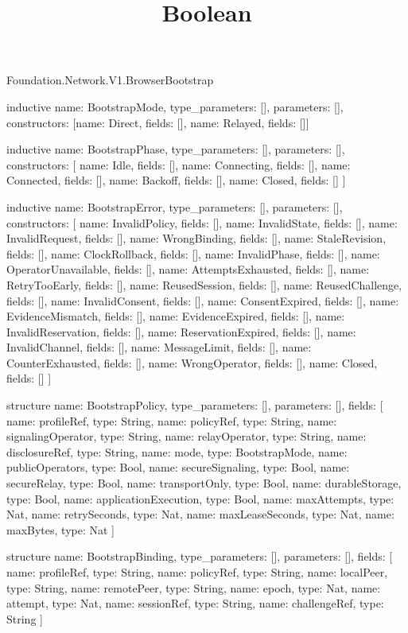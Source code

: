 \begin{lexlean}{Foundation.Network.V1.BrowserBootstrap}
\title{Boolean}
\begin{semanticmodule}
inductive{
  name: BootstrapMode,
  type_parameters: [],
  parameters: [],
  constructors: [{name: Direct, fields: []}, {name: Relayed, fields: []}]
}

inductive{
  name: BootstrapPhase,
  type_parameters: [],
  parameters: [],
  constructors: [
    {name: Idle, fields: []},
    {name: Connecting, fields: []},
    {name: Connected, fields: []},
    {name: Backoff, fields: []},
    {name: Closed, fields: []}
  ]
}

inductive{
  name: BootstrapError,
  type_parameters: [],
  parameters: [],
  constructors: [
    {name: InvalidPolicy, fields: []},
    {name: InvalidState, fields: []},
    {name: InvalidRequest, fields: []},
    {name: WrongBinding, fields: []},
    {name: StaleRevision, fields: []},
    {name: ClockRollback, fields: []},
    {name: InvalidPhase, fields: []},
    {name: OperatorUnavailable, fields: []},
    {name: AttemptsExhausted, fields: []},
    {name: RetryTooEarly, fields: []},
    {name: ReusedSession, fields: []},
    {name: ReusedChallenge, fields: []},
    {name: InvalidConsent, fields: []},
    {name: ConsentExpired, fields: []},
    {name: EvidenceMismatch, fields: []},
    {name: EvidenceExpired, fields: []},
    {name: InvalidReservation, fields: []},
    {name: ReservationExpired, fields: []},
    {name: InvalidChannel, fields: []},
    {name: MessageLimit, fields: []},
    {name: CounterExhausted, fields: []},
    {name: WrongOperator, fields: []},
    {name: Closed, fields: []}
  ]
}

structure{
  name: BootstrapPolicy,
  type_parameters: [],
  parameters: [],
  fields: [
    {name: profileRef, type: String},
    {name: policyRef, type: String},
    {name: signalingOperator, type: String},
    {name: relayOperator, type: String},
    {name: disclosureRef, type: String},
    {name: mode, type: BootstrapMode},
    {name: publicOperators, type: Bool},
    {name: secureSignaling, type: Bool},
    {name: secureRelay, type: Bool},
    {name: transportOnly, type: Bool},
    {name: durableStorage, type: Bool},
    {name: applicationExecution, type: Bool},
    {name: maxAttempts, type: Nat},
    {name: retrySeconds, type: Nat},
    {name: maxLeaseSeconds, type: Nat},
    {name: maxBytes, type: Nat}
  ]
}

structure{
  name: BootstrapBinding,
  type_parameters: [],
  parameters: [],
  fields: [
    {name: profileRef, type: String},
    {name: policyRef, type: String},
    {name: localPeer, type: String},
    {name: remotePeer, type: String},
    {name: epoch, type: Nat},
    {name: attempt, type: Nat},
    {name: sessionRef, type: String},
    {name: challengeRef, type: String}
  ]
}


\end{semanticmodule}
\end{lexlean}
